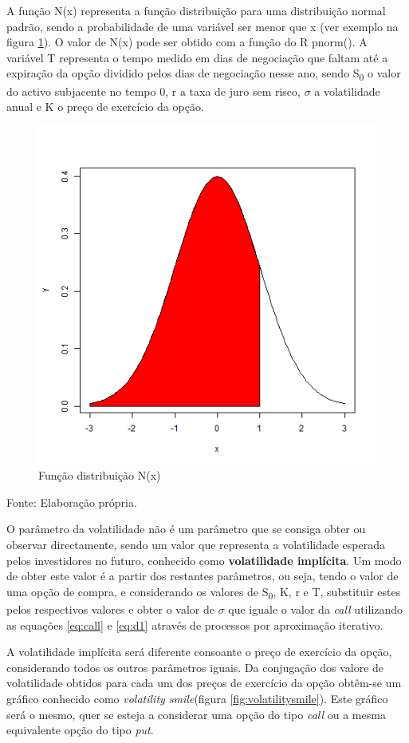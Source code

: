 \documentclass[
  12pt,
  a4paper,
  openany]{book}
\begin{document}
A função N(x) representa a função distribuição para uma distribuição normal padrão, sendo a probabilidade de uma variável ser menor que x (ver exemplo na figura \ref{fig:fdistribuicao}). O valor de N(x) pode ser obtido com a função do R pnorm(). A variável T representa o tempo medido em dias de negociação que faltam até a expiração da opção dividido pelos dias de negociação nesse ano, sendo S\textsubscript{0} o valor do activo subjacente no tempo 0, r a taxa de juro sem risco, \(\sigma\) a volatilidade anual e K o preço de exercício da opção.

\begin{figure}

{\centering \includegraphics[width=0.45\linewidth]{image/fdistribuicao} 

}

\caption{Função distribuição N(x)}\label{fig:fdistribuicao}
\end{figure}
\centering

Fonte: Elaboração própria.

\justifying
\bigskip

O parâmetro da volatilidade não é um parâmetro que se consiga obter ou observar directamente, sendo um valor que representa a volatilidade esperada pelos investidores no futuro, conhecido como \textbf{volatilidade implícita}. Um modo de obter este valor é a partir dos restantes parâmetros, ou seja, tendo o valor de uma opção de compra, e considerando os valores de S\textsubscript{0}, K, r e T, substituir estes pelos respectivos valores e obter o valor de \(\sigma\) que iguale o valor da \emph{call} utilizando as equações \eqref{eq:call} e \eqref{eq:d1} através de processos por aproximação iterativo.

A volatilidade implícita será diferente consoante o preço de exercício da opção, considerando todos os outros parâmetros iguais. Da conjugação dos valore de volatilidade obtidos para cada um dos preços de exercício da opção obtêm-se um gráfico conhecido como \emph{volatility smile}(figura \ref{fig:volatilitysmile}). Este gráfico será o mesmo, quer se esteja a considerar uma opção do tipo \emph{call} ou a mesma equivalente opção do tipo \emph{put}.
\end{document}

